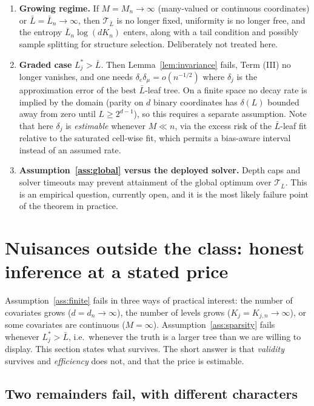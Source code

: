 \documentclass[11pt]{article}
\theoremstyle{plain}
\theoremstyle{definition}
\theoremstyle{remark}
\newcommand{\cT}{\mathcal{T}}
\begin{document}
\begin{enumerate}[nosep,label=(\arabic*)]
  \item \textbf{Growing regime.} If $M=M_n\to\infty$ (many-valued or continuous
  coordinates) or $\bar L=\bar L_n\to\infty$, then $\cT_{\bar L}$ is no longer
  fixed, uniformity is no longer free, and the entropy $\bar L_n\log(dK_n)$
  enters, along with a tail condition and possibly sample splitting for structure
  selection. Deliberately not treated here.
  \item \textbf{Graded case} $L^*_j>\bar L$. Then
  Lemma~\ref{lem:invariance} fails, Term (III) no longer vanishes, and one needs
  $\delta_e\delta_\mu=o(n^{-1/2})$ where $\delta_j$ is the approximation error of
  the best $\bar L$-leaf tree. On a finite space no decay rate is implied by the
  domain (parity on $d$ binary coordinates has $\delta(L)$ bounded away from zero
  until $L\ge2^{d-1}$), so this requires a separate assumption. Note that here
  $\delta_j$ is \emph{estimable} whenever $M\ll n$, via the excess risk of the
  $\bar L$-leaf fit relative to the saturated cell-wise fit, which permits a
  bias-aware interval instead of an assumed rate.
  \item \textbf{Assumption~\ref{ass:global} versus the deployed solver.} Depth
  caps and solver timeouts may prevent attainment of the global optimum over
  $\cT_{\bar L}$. This is an empirical question, currently open, and it is the
  most likely failure point of the theorem in practice.
\end{enumerate}

\section{Nuisances outside the class: honest inference at a stated
price}\label{sec:outside}

Assumption~\ref{ass:finite} fails in three ways of practical interest: the number
of covariates grows ($d=d_n\to\infty$), the number of levels grows
($K_j=K_{j,n}\to\infty$), or some covariates are continuous ($M=\infty$).
Assumption~\ref{ass:sparsity} fails whenever $L^*_j>\bar L$, i.e.\ whenever the
truth is a larger tree than we are willing to display. This section states what
survives. The short answer is that \emph{validity} survives and \emph{efficiency}
does not, and that the price is estimable.

\subsection{Two remainders fail, with different characters}
\end{document}
